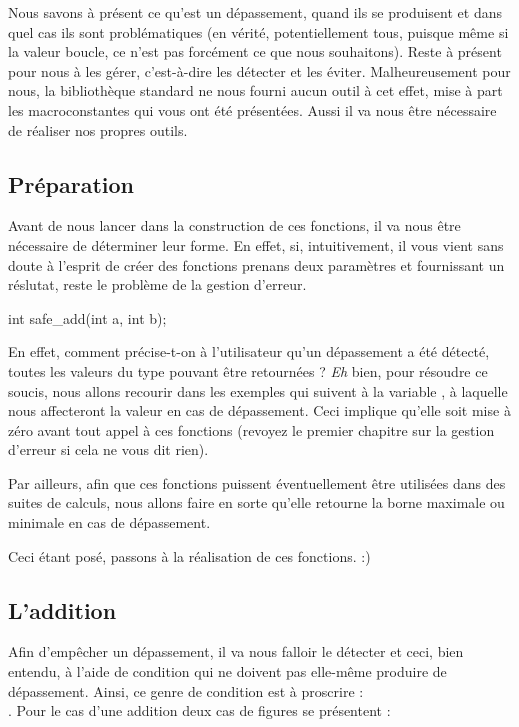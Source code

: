 Nous savons à présent ce qu'est un dépassement, quand ils se produisent 
et dans quel cas ils sont problématiques (en vérité, potentiellement 
tous, puisque même si la valeur boucle, ce n'est pas forcément ce que nous 
souhai\-tons). Reste à présent pour nous à les gérer, c'est-à-dire les détecter 
et les éviter. Malheureusement pour nous, la bibliothèque standard ne nous 
fourni aucun outil à cet effet, mise à part les macroconstantes qui vous ont été
présentées. Aussi il va nous être nécessaire de réaliser nos propres outils.

\subsection{Préparation}
\label{preparation-3}

Avant de nous lancer dans la construction de ces fonctions, il va nous
être nécessaire de déterminer leur forme. En effet, si, intuitivement,
il vous vient sans doute à l'esprit de créer des fonctions prenans deux
paramètres et fournissant un réslutat, reste le problème de la gestion
d'erreur.

\begin{C}
int safe_add(int a, int b);
\end{C}

En effet, comment précise-t-on à l'utilisateur qu'un dépassement a été
détecté, toutes les valeurs du type  pouvant être retournées
? \emph{Eh} bien, pour résoudre ce soucis, nous allons recourir dans les
exemples qui suivent à la variable , à laquelle nous
affecteront la valeur  en cas de dépassement. Ceci
implique qu'elle soit mise à zéro avant tout appel à ces fonctions
(revoyez le premier chapitre sur la gestion d'erreur si cela ne vous dit
rien).

Par ailleurs, afin que ces fonctions puissent éventuellement être
utilisées dans des suites de calculs, nous allons faire en sorte qu'elle
retourne la borne maximale ou minimale en cas de dépassement.

Ceci étant posé, passons à la réalisation de ces fonctions. :)

\subsection{L'addition}
\label{laddition-1}

Afin d'empêcher un dépassement, il va nous falloir le détecter et ceci,
bien entendu, à l'aide de condition qui ne doivent pas elle-même
produire de dépassement. Ainsi, ce genre de condition est à proscrire :\\
. Pour le cas d'une
addition deux cas de figures se présentent :


